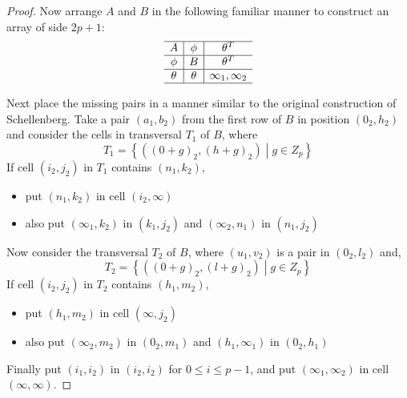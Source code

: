 \begin{proof}
Now arrange $A$ and $B$ in the following familiar manner to construct an array of side $2p + 1$:
\begin{equation}
\begin{array}{c|c|c}
\hline
      A     &   \phi   &       \theta ^T   \\ \hline
     \phi   &    B     &       \theta ^T   \\ \hline
    \theta  &  \theta  &  \infty _1, \infty _2  \\ \hline
\end{array}
\end{equation}

Next place the missing pairs in a manner similar to the original construction of Schellenberg.
Take a pair $(a_1, b_2)$ from the first row of $B$ in position $(0_2, h_2)$ and consider the cells in transversal $T_1$ of $B$, where $$T_1 = \left \{((0 + g)_2,(h + g)_2) \middle| g \in Z_p \right \}$$
If cell $(i_2, j_2)$ in $T_1$ contains $(n_1, k_2)$,
\begin{itemize}
  \item{put $(n_1, k_2)$ in cell $(i_2, \infty)$}
  \item{also put $(\infty _1, k_2)$ in $(k_1, j_2)$ and
    $(\infty _2, n_1)$ in $(n_1, j_2)$}
\end{itemize}

Now consider the transversal $T_2$ of $B$, where $(u_1, v_2)$ is a pair in $(0_2, l_2)$ and,
\begin{equation}
T_2 = \left \{((0 + g)_2, (l + g)_2) \middle| g \in Z_p \right \}
\end{equation}
If cell $(i_2, j_2)$ in $T_2$ contains $(h_1, m_2)$,
\begin{itemize}
  \item{put $(h_1, m_2)$ in cell $(\infty, j_2)$}
  \item{also put $(\infty _2, m_2)$ in $(0_2, m_1)$ and
    $(h_1, \infty _1)$ in $(0_2,h_1)$}
\end{itemize}

Finally put $(i_1, i_2)$ in $(i_2, i_2)$ for $0 \leq i \leq p - 1$, and put $(\infty _1, \infty _2)$ in cell $(\infty, \infty)$.
\end{proof}

